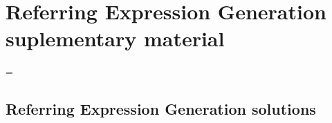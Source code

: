 \chapter[REG suplementary material]{Referring Expression Generation suplementary material}
\label{app:reg}

\LTcapwidth=\textwidth


\let\oldlongtable\longtable
\let\endoldlongtable\endlongtable

\def\zza{\global\let\zz\zzb
\fullwidthcolor{lightgray}}%

\def\zzb{\global\let\zz\zza}

\def\fullwidthcolor#1{\color{#1}\leaders\vrule\hskip\textwidth\hskip-\textwidth\kern0pt}
\def\resetLTcolor{\global\let\zz\zza}


\section{Referring Expression Generation solutions}
\label{app:reg_solutions}

